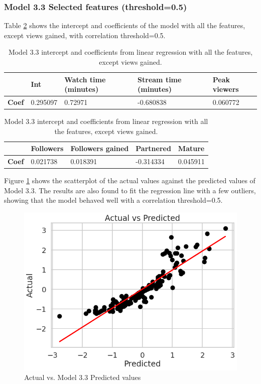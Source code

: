 \documentclass[runningheads]{llncs}
\begin{document}
\subsubsection{Model 3.3 Selected features (threshold=0.5)}

Table \ref{tab:model3_3} shows the intercept and coefficients of the model with all the features,  except views gained, with correlation threshold=0.5. \\

\begingroup
\setlength{\tabcolsep}{8pt} %
\renewcommand{\arraystretch}{1.2} %
\begin{table}[h]
    \centering
    \caption{Model 3.3 intercept and coefficients from linear regression with all the features,  except views gained.}
    \begin{tabular}{|p{.10\linewidth}|p{.14\linewidth}|p{.15\linewidth}|p{.15\linewidth}|p{.14\linewidth}|}
        \hline
      & \textbf{Int} & \textbf{Watch time (minutes)} & \textbf{Stream time (minutes)} &	\textbf{Peak viewers}\\
     \hline
     \textbf{Coef} &  0.295097 & 0.72971	& -0.680838	& 0.060772	\\
   \hline
    \end{tabular}
    \begin{tabular}{|p{.10\linewidth}|p{.14\linewidth}|p{.15\linewidth}|p{.15\linewidth}|p{.14\linewidth}|}
    \hline 
     & \textbf{Followers}	& \textbf{Followers gained} & \textbf{Partnered} & \textbf{Mature} \\
     \hline
    \textbf{Coef} & 0.021738	& 0.018391	& -0.314334	& 0.045911 \\
    \hline 
    \end{tabular}
    \label{tab:model3_3}
\end{table}
\endgroup

Figure \ref{fig:model3_3} shows the scatterplot of the actual values against the predicted values of Model 3.3. The results are also found to fit the regression line with a few outliers, showing that the model behaved well with a correlation threshold=0.5. \\

\begin{figure}[h]
    \centering
    \includegraphics[width=0.6\linewidth]{figures/graphs/model_3_3_graph.png}
    \caption{Actual vs. Model 3.3 Predicted values }
  \label{fig:model3_3}
\end{figure}
\end{document}
